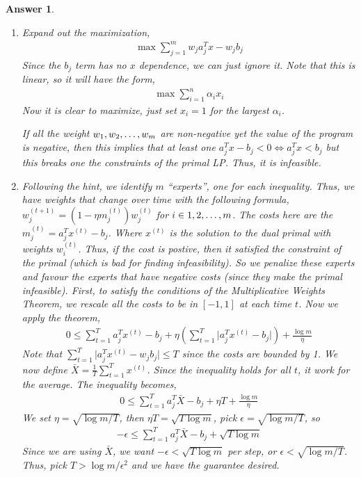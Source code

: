 \documentclass[12pt]{article}
\theoremstyle{colon}
\newtheorem*{answer}{Answer}
\begin{document}
\begin{answer}
  \leavevmode
  \begin{enumerate}[label=\arabic*)]
    \item Expand out the maximization,
      \begin{gather*}
        \max \sum_{j=1}^m w_j a_j^T x - w_j b_j
      \end{gather*}
      Since the $b_j$ term has no $x$ dependence, we can just ignore it. Note that this is linear, so it will have the form,
      \begin{gather*}
        \max \sum_{i=1}^n \alpha_i x_i
      \end{gather*}
      Now it is clear to maximize, just set $x_i = 1$ for the largest $\alpha_i$.

      If all the weight $w_1, w_2, \mathellipsis, w_m$ are non-negative yet the value of the program is negative, then this implies that at least one $a_j^T x - b_j < 0 \Longleftrightarrow a_j^T x < b_j$ but this breaks one the constraints of the primal LP. Thus, it is infeasible.
    \item Following the hint, we identify $m$ ``experts'', one for each inequality. Thus, we have weights that change over time with the following formula, $w_j^{(t+1)} = (1 - \eta m_j^{(t)})w_j^{(t)}$ for $i \in {1,2,\mathellipsis,m}$. The costs here are the $m_j^{(t)} = a_j^T x^{(t)} - b_j$. Where $x^{(t)}$ is the solution to the dual primal with weights $w_i^{(t)}$. Thus, if the cost is postive, then it satisfied the constraint of the primal (which is bad for finding infeasibility). So we penalize these experts and favour the experts that have negative costs (since they make the primal infeasible). First, to satisfy the conditions of the Multiplicative Weights Theorem, we rescale all the costs to be in $[-1,1]$ at each time $t$. Now we apply the theorem,
    \begin{gather*}
      0 \leq \sum_{t=1}^T a_j^T x^{(t)} - b_j + \eta(\sum_{t=1}^T \lvert a_j^T x^{(t)} - b_j \rvert) + \frac{\log{m}}{\eta}
    \end{gather*}
    Note that $\sum_{t=1}^T \lvert a_j^T x^{(t)} - w_j b_j \rvert \leq T$ since the costs are bounded by 1. We now define $\bar{X} = \frac{1}{T} \sum_{t=1}^T x^{(t)}$. Since the inequality holds for all $t$, it work for the average. The inequality becomes,
    \begin{gather*}
      0 \leq \sum_{t=1}^T a_j^T \bar{X} - b_j + \eta T + \frac{\log{m}}{\eta}
    \end{gather*}
    We set $\eta = \sqrt{\log{m}/T}$, then $\eta T = \sqrt{T \log{m}}$, pick $\epsilon = \sqrt{\log m/T}$, so
    \begin{gather*}
      -\epsilon \leq \sum_{t=1}^T a_j^T \bar{X} - b_j + \sqrt{T \log{m}}
    \end{gather*}
    Since we are using $\bar{X}$, we want $-\epsilon < \sqrt{T \log{m}}$ per step, or $\epsilon < \sqrt{\log{m}/T}$. Thus, pick $T > \log{m}/\epsilon^2$ and we have the guarantee desired.
  \end{enumerate}
\end{answer}
\end{document}
